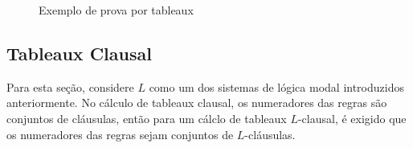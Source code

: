 \begin{figure}
    \label{fig:example2}
    \begin{center}
    \end{center}
    \caption{Exemplo de prova por tableaux}
\end{figure}

\subsection{Tableaux Clausal}
Para esta seção, considere $L$ como um dos sistemas de lógica modal introduzidos
anteriormente. No cálculo de tableaux clausal, os numeradores das regras são
conjuntos de cláusulas, então para um cálclo de tableaux $L$-clausal, é exigido
que os numeradores das regras sejam conjuntos de $L$-cláusulas.~\cite{clausal_tableaux}
